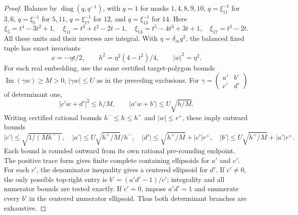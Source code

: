\begin{proof}
Balance by $\operatorname{diag}(q,q^{-1})$, with $q=1$ for masks
$1,4,8,9,10$, $q=\xi_{11}^{-1}$ for $3,6$,
$q=\xi_5^{-1}$ for $5,11$, $q=\xi_{17}^{-1}$ for $12$, and
$q=\xi_{13}^{-1}$ for $14$. Here
\[
 \xi_5=t^4-3t^2+1,\quad \xi_{11}=t^3+t^2-2t-1,\quad
 \xi_{13}=t^5-4t^3+3t+1,\quad \xi_{17}=t^3-2t.
\]
All these units and their inverses are integral. With $\eta=\delta_mq^2$,
the balanced fixed tuple has exact invariants
\[
 x=-\eta t/2,\qquad h^2=\eta^2(4-t^2)/4,\qquad |w|^2=\eta^2.
\]
For each real embedding, use the same certified target-polygon bounds
$\operatorname{Im}(\gamma w)\ge M>0$, $|\gamma w|\le U$ as in the
preceding exclusions. For
$\gamma=\left(\begin{smallmatrix}a'&b'\\c'&d'\end{smallmatrix}\right)$
of determinant one,
\[
 |c'w+d'|^2\le h/M,\qquad |a'w+b'|\le U\sqrt{h/M}.
\]
Writing certified rational bounds $h^-\le h\le h^+$ and $|w|\le r^+$,
these imply outward bounds
\[
 |c'|\le\sqrt{1/(Mh^-)},\quad
 |a'|\le U\sqrt{h^+/M}/h^-,\quad
 |d'|\le\sqrt{h^+/M}+|c'|r^+,\quad
 |b'|\le U\sqrt{h^+/M}+|a'|r^+.
\]
Each bound is rounded outward from its own rational pre-rounding endpoint.
The positive trace form gives finite complete containing ellipsoids for
$a'$ and $c'$. For each $c'$, the denominator inequality gives a centered
ellipsoid for $d'$. If $c'\ne0$, the only possible top-right entry is
$b'=(a'd'-1)/c'$; integrality and all numerator bounds are tested exactly.
If $c'=0$, impose $a'd'=1$ and enumerate every $b'$ in the centered
numerator ellipsoid. Thus both determinant branches are exhaustive.


\end{proof}
